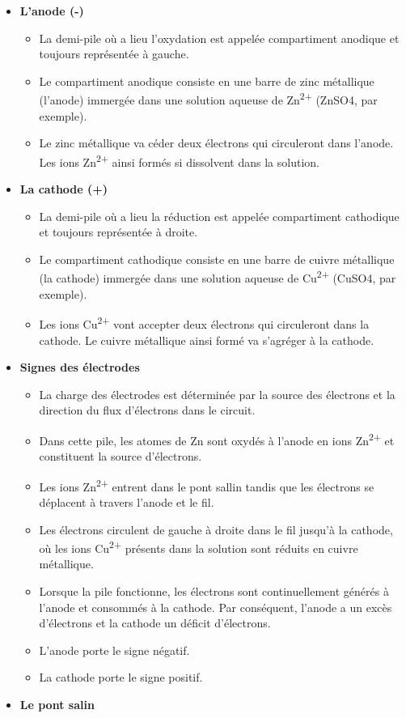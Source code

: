 \documentclass[
  11pt,
  french,
  a4paper,
  openany]{book}
\providecommand{\tightlist}{%
  \setlength{\itemsep}{0pt}\setlength{\parskip}{0pt}}
\begin{document}
\begin{itemize}
\tightlist
\item
  \textbf{L'anode (-)}

  \begin{itemize}
  \tightlist
  \item
    La demi-pile où a lieu l'oxydation est appelée compartiment anodique et toujours représentée à gauche.
  \item
    Le compartiment anodique consiste en une barre de zinc métallique (l'anode) immergée dans une solution aqueuse de Zn\textsuperscript{2+} (ZnSO4, par exemple).
  \item
    Le zinc métallique va céder deux électrons qui circuleront dans l'anode. Les ions Zn\textsuperscript{2+} ainsi formés si dissolvent dans la solution.
  \end{itemize}
\item
  \textbf{La cathode (+)}

  \begin{itemize}
  \tightlist
  \item
    La demi-pile où a lieu la réduction est appelée compartiment cathodique et toujours représentée à droite.
  \item
    Le compartiment cathodique consiste en une barre de cuivre métallique (la cathode) immergée dans une solution aqueuse de Cu\textsuperscript{2+} (CuSO4, par exemple).
  \item
    Les ions Cu\textsuperscript{2+} vont accepter deux électrons qui circuleront dans la cathode. Le cuivre métallique ainsi formé va s'agréger à la cathode.
  \end{itemize}
\item
  \textbf{Signes des électrodes}

  \begin{itemize}
  \tightlist
  \item
    La charge des électrodes est déterminée par la source des électrons et la direction du flux d'électrons dans le circuit.
  \item
    Dans cette pile, les atomes de Zn sont oxydés à l'anode en ions Zn\textsuperscript{2+} et constituent la source d'électrons.
  \item
    Les ions Zn\textsuperscript{2+} entrent dans le pont sallin tandis que les électrons se déplacent à travers l'anode et le fil.
  \item
    Les électrons circulent de gauche à droite dans le fil jusqu'à la cathode, où les ions Cu\textsuperscript{2+} présents dans la solution sont réduits en cuivre métallique.
  \item
    Lorsque la pile fonctionne, les électrons sont continuellement générés à l'anode et consommés à la cathode. Par conséquent, l'anode a un excès d'électrons et la cathode un déficit d'électrons.
  \item
    L'anode porte le signe négatif.
  \item
    La cathode porte le signe positif.
  \end{itemize}
\item
  \textbf{Le pont salin}


\end{itemize}
\end{document}

